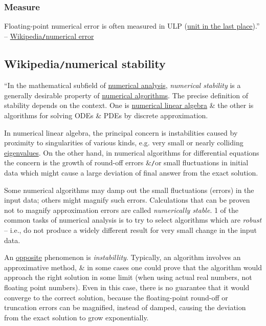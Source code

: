 \documentclass{article}
\begin{document}
\subsubsection{Measure}
Floating-point numerical error is often measured in ULP (\href{https://en.wikipedia.org/wiki/Unit_in_the_last_place}{unit in the last place}).'' -- \href{https://en.wikipedia.org/wiki/Numerical_error}{Wikipedia{\tt/}numerical error}


\subsection{Wikipedia{\tt/}numerical stability}
``In the mathematical subfield of \href{https://en.wikipedia.org/wiki/Numerical_analysis}{numerical analysis}, {\it numerical stability} is a generally desirable property of \href{https://en.wikipedia.org/wiki/Numerical_algorithm}{numerical algorithms}. The precise definition of stability depends on the context. One is \href{https://en.wikipedia.org/wiki/Numerical_linear_algebra}{numerical linear algebra} \& the other is algorithms for solving ODEs \& PDEs by discrete approximation.

In numerical linear algebra, the principal concern is instabilities caused by proximity to singularities of various kinds, e.g. very small or nearly colliding \href{https://en.wikipedia.org/wiki/Eigenvalues}{eigenvalues}. On the other hand, in numerical algorithms for differential equations the concern is the growth of round-off errors \&{\tt/}or small fluctuations in initial data which might cause a large deviation of final answer from the exact solution.

Some numerical algorithms may damp out the small fluctuations (errors) in the input data; others might magnify such errors. Calculations that can be proven not to magnify approximation errors are called {\it numerically stable}. 1 of the common tasks of numerical analysis is to try to select algorithms which are {\it robust} -- i.e., do not produce a widely different result for very small change in the input data.

An \href{https://en.wikipedia.org/wiki/Opposite_(semantics)}{opposite} phenomenon is {\it instabillity}. Typically, an algorithm involves an approximative method, \& in some cases one could prove that the algorithm would approach the right solution in some limit (when using actual real numbers, not floating point numbers). Even in this case, there is no guarantee that it would converge to the correct solution, because the floating-point round-off or truncation errors can be magnified, instead of damped, causing the deviation from the exact solution to grow exponentially.
\end{document}
